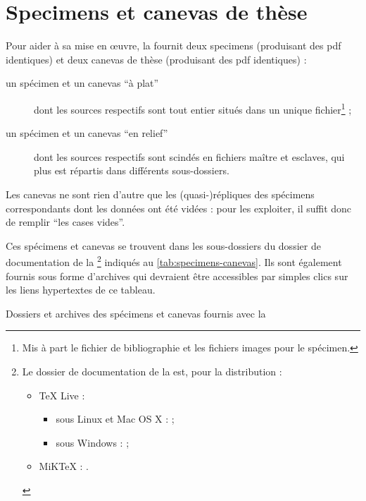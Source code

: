 \chapter{Specimens et canevas de thèse}\label{cha:specimen-canevas}

Pour aider à sa mise en œuvre, la \yatcl fournit deux specimens (produisant
des \gls{pdf} identiques) et deux canevas de thèse (produisant des \gls{pdf}
identiques) :
\begin{description}
\item[un spécimen et un canevas \enquote{à plat}] dont les sources 
  respectifs sont tout entier situés dans un unique fichier\footnote{Mis à part
    le fichier de bibliographie et les fichiers images pour le spécimen.} ;
\item[un spécimen et un canevas \enquote{en relief}] dont les sources
   respectifs sont scindés en fichiers maître et esclaves, qui plus
  est répartis dans différents sous-dossiers.
\end{description}
Les canevas ne sont rien d'autre que les (quasi-)répliques des spécimens
correspondants dont les données ont été vidées : pour les exploiter, il suffit
donc de remplir \enquote{les cases vides}.

Ces spécimens et canevas se trouvent dans les sous-dossiers du dossier de
documentation de la \yatcl{}\footnote{Le dossier de documentation de la
  \yatcl{} est, pour la distribution :
  \begin{itemize}
  \item \TeX{} Live :
    \begin{itemize}
    \item sous Linux et Mac OS X :
      \unixtldirectory\tldistdirectory\jobdocdirectory{} ;
    \item sous Windows :
      \wintldirectory\tldistdirectory\jobdocdirectory{} ;
    \end{itemize}
  \item MiK\TeX{} : \miktexdistdirectory.
  \end{itemize}
  \label{fn:yathesisdocfolder}} indiqués au \vref{tab:specimens-canevas}. Ils
sont également fournis sous forme d'archives  qui devraient être
accessibles par simples clics sur les liens hypertextes de ce tableau.
\begin{table}
  \centering
  
  \caption{Dossiers et archives  des spécimens et canevas fournis
    avec la \yatcl{}}
  \label{tab:specimens-canevas}
\end{table}

